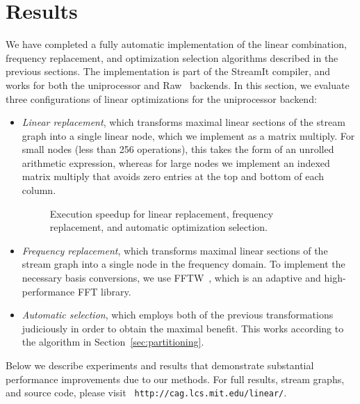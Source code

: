 \section{Results}
\label{sec:results}

We have completed a fully automatic implementation of the linear
combination, frequency replacement, and optimization selection
algorithms described in the previous sections.  The implementation is
part of the StreamIt compiler, and works for both the uniprocessor and
Raw~\cite{raw-micro} backends.  In this section, we evaluate three
configurations of linear optimizations for the uniprocessor backend:
\begin{itemize}

\item {\it Linear replacement}, which transforms maximal linear
sections of the stream graph into a single linear node, which we
implement as a matrix multiply.  For small nodes (less than 256
operations), this takes the form of an unrolled arithmetic expression,
whereas for large nodes we implement an indexed matrix multiply that
avoids zero entries at the top and bottom of each column.

\begin{figure}[t]
\vspace{-16pt}
\vspace{-16pt}
\caption{Execution speedup for linear replacement, frequency replacement, and automatic optimization selection.}
\label{fig:execution-speedup}
\vspace{-12pt}
\makeline
\vspace{-12pt}
\end{figure}

\item {\it Frequency replacement}, which transforms maximal linear
sections of the stream graph into a single node in the frequency
domain.  To implement the necessary basis conversions, we use
FFTW~\cite{frigo99fast}, which is an adaptive and high-performance FFT
library.

\item {\it Automatic selection}, which employs both of the previous
transformations judiciously in order to obtain the maximal benefit.
This works according to the algorithm in
Section~\ref{sec:partitioning}.
\end{itemize}
Below we describe experiments and results that demonstrate substantial
performance improvements due to our methods.  For full results, stream
graphs, and source code, please visit {\tt
http://cag.lcs.mit.edu/linear/}.

